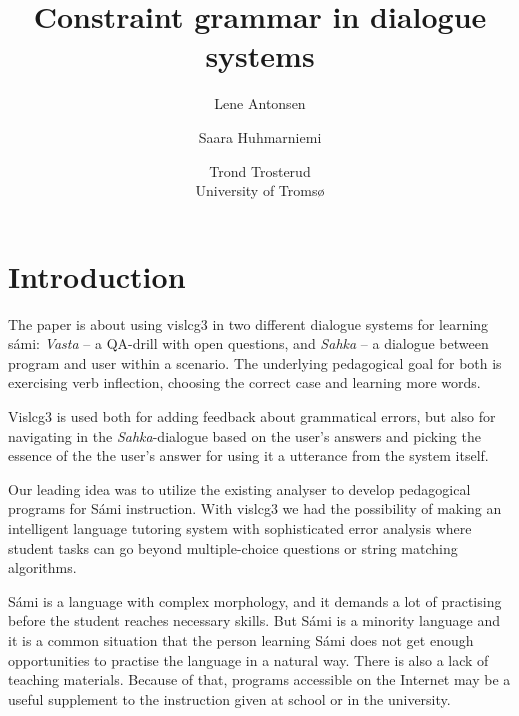 \documentclass[11pt]{article}
\title{Constraint grammar in dialogue systems}
\author{Lene Antonsen  \and
              Saara Huhmarniemi \and Trond Trosterud \\ University of Tromsø}
\begin{document}

\maketitle
{}
 
\maketitle




\section{Introduction} 

The paper is about using vislcg3 in two different dialogue systems for learning sámi: \textit{Vasta} -- a QA-drill with open questions, and \textit{Sahka} -- a  dialogue between program and user within a scenario. The underlying pedagogical goal for both is exercising verb inflection, choosing the correct case and learning more words. 



Vislcg3 is used both for adding feedback about grammatical errors, but also for navigating in the \textit{Sahka}-dialogue based on the user's answers and picking the essence of the the user's answer for using it a utterance from the system itself. 

Our leading idea was to utilize the existing analyser to develop pedagogical programs for Sámi instruction. With vislcg3 we had the possibility of making an intelligent language tutoring system with sophisticated error analysis where student tasks can go beyond multiple-choice questions or string matching algorithms. 

Sámi is a language with complex morphology, and it demands a lot of practising before the student reaches necessary skills. But Sámi is a minority language and it is a common situation that the person learning Sámi does not get enough opportunities to practise the language in a natural way. There is also a lack of teaching materials. Because of that, programs accessible on the Internet may be a useful supplement to the instruction given at school or in the university. 
\end{document}
